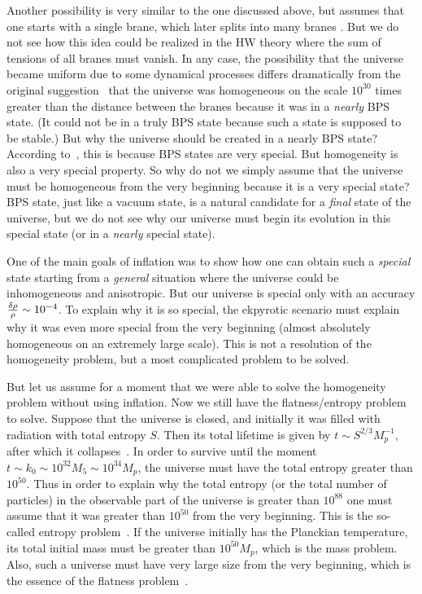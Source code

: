 \documentclass[a4paper,12pt]{article}
\begin{document}
Another possibility is very similar to the one discussed above, but assumes that one starts with a single brane, which later splits into many branes \cite{Khoury:2001iy}. But we do not see how this idea could be realized in the HW theory where the sum of tensions of all branes must vanish. In any case, the possibility that the universe became uniform due to some dynamical processes differs dramatically from the original suggestion~\cite{KOST}  that the universe was homogeneous on the scale $10^{30}$ times greater than the distance between the branes because it was  in a  {\it nearly}  BPS state. (It could not be in a truly BPS state because such a state is supposed to be stable.) But why the universe should be created in a  nearly  BPS state? According to~\cite{KOST}, this is because BPS states are very special. But homogeneity is also a very special property. So why do not we simply assume that the universe must be homogeneous from the very beginning because it is a very special state? BPS state, just like a vacuum state, is a natural candidate for a {\it final} state of the universe, but we do not see why our universe must begin its evolution in this special state (or in a {\it nearly} special state).

One of the main goals of inflation was to show how one can obtain such a {\it special} state starting from a {\it general} situation where the universe could be inhomogeneous and anisotropic. But our universe is special only with an accuracy ${\delta\rho\over \rho}\sim 10^{-4}$. To explain why it is so special, the ekpyrotic scenario must explain why it was even more special  from the very beginning (almost absolutely homogeneous on an extremely large scale). This is not a resolution of the homogeneity problem, but a most complicated problem to be solved. 





But let us assume for a moment that we were able to solve the homogeneity problem without using inflation. Now we still have the flatness/entropy problem to solve.   Suppose that the universe is closed, and initially it was filled with radiation with total entropy $S$. Then its total lifetime is given by $t \sim S^{2/3} M_p^{-1}$,
after which it collapses~\cite{book}. In order to survive until the
moment $t \sim k_0 \sim 10^{32} M_5 \sim 10^{34} M_p$, the universe must
have the total entropy greater than $10^{50}$.  Thus in order to explain why the total entropy (or the
total number of particles) in the observable part of the universe is
greater than $10^{88}$ one must assume that it was greater than $10^{50}$
from the very beginning. This is the so-called entropy problem~\cite{book}. If the universe initially has the Planckian temperature, its
total initial mass must be greater than $10^{50} M_p$, which is the mass problem.
Also, such a universe must have very large size from the very beginning, which is the essence of the flatness problem~\cite{book}.
\end{document}
